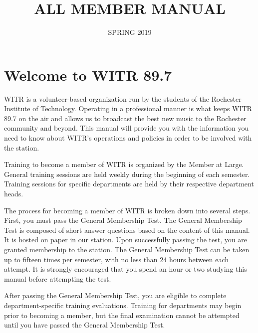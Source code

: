 \documentclass{witrman}
\date{SPRING 2019}
\title{ALL MEMBER MANUAL}
\begin{document}
\maketitle  %

\maketoc{}  %

\setpagebg{}

\mbox{}
\vspace{16pt}
\chapter{Welcome to WITR 89.7}

WITR is a volunteer-based organization run by the students of the Rochester
Institute of Technology.  Operating in a professional manner is what keeps WITR
89.7 on the air and allows us to broadcast the best new music to the Rochester
community and beyond.  This manual will provide you with the information you
need to know about WITR’s operations and policies in order to be involved with
the station.

Training to become a member of WITR is organized by the Member at Large.
General training sessions are held weekly during the beginning of each semester.
Training sessions for specific departments are held by their respective
department heads.

The process for becoming a member of WITR is broken down into several steps.
First, you must pass the General Membership Test.  The General Membership Test
is composed of short answer questions based on the content of this manual.  It
is hosted on paper in our station.  Upon successfully passing the test, you are
granted membership to the station.  The General Membership Test can be taken up
to fifteen times per semester, with no less than 24 hours between each attempt.
It is strongly encouraged that you spend an hour or two studying this manual
before attempting the test.

After passing the General Membership Test, you are eligible to complete
department-specific training evaluations.  Training for departments may begin
prior to becoming a member, but the final examination cannot be attempted until
you have passed the General Membership Test.
\end{document}
